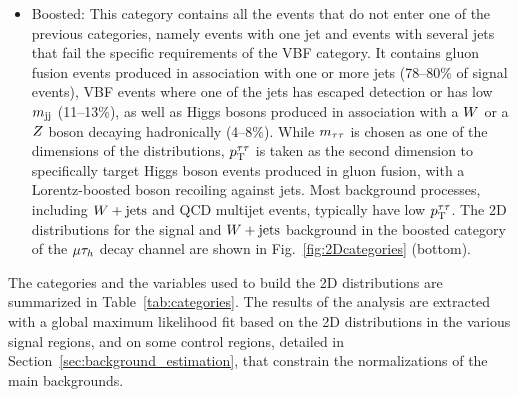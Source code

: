 \begin{itemize}
In addition, the $\pt$ threshold on the $\tauh$ candidate is raised to 40\GeV in the $\Pgm\tauh$ channel, and the
two leading jets in the $\tauh\tauh$ channel should be separated in pseudorapidity by $\Delta\eta>2.5$.
The two observables in the VBF category are $\mtt$ and $\mjj$. The 2D distributions for the signal and $\PZ\to\Pgt\Pgt$ background
in the VBF category of the $\Pgm\tauh$ decay channel are shown in Fig.~\ref{fig:2Dcategories} (center). Integrating over the whole $\mjj$ phase space, up to 57\% of the signal events in the VBF category are produced in the VBF production mode, but this proportion increases with $\mjj$.\\
\item {Boosted}: This category contains all the events that do not
enter one of the previous categories, namely events with one jet and events with several jets that fail the specific requirements of the VBF category.
It contains gluon fusion events produced in association with one or more jets (78--80\% of signal events),
VBF events where one of the jets has escaped detection or has low $\mjj$ (11--13\%), as well as
Higgs bosons produced in association with a $W$ or a $Z$ boson decaying hadronically (4--8\%).
While $\mtt$ is chosen as one of the dimensions of the distributions, $p_\mathrm{T}^{\tau\tau}$ is taken as the second dimension to specifically target Higgs boson events produced in gluon fusion,
with a Lorentz-boosted boson recoiling against jets. Most background processes, including $W+\text{jets}$ and QCD multijet events, typically have low $p_\mathrm{T}^{\tau\tau}$. The 2D
distributions for the signal and $W+\text{jets}$ background in the boosted category of the $\Pgm\tauh$ decay channel are shown in Fig.~\ref{fig:2Dcategories} (bottom).
\end{itemize}

The categories and the variables used to build the 2D distributions are summarized in
Table~\ref{tab:categories}. The results of the analysis are extracted with a global maximum likelihood fit based on  the 2D distributions in the various signal regions, and on some control regions, detailed in Section~\ref{sec:background_estimation}, that constrain the normalizations of the main backgrounds.

